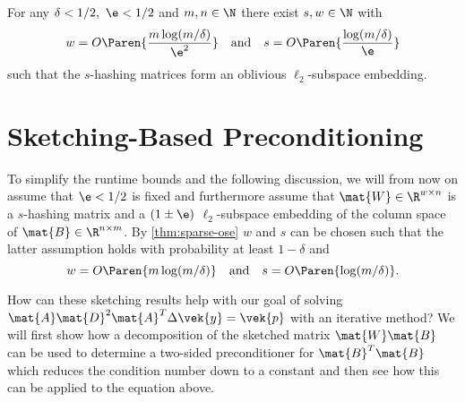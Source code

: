\begin{theorem}\label{thm:sparse-ose}
For any \(\delta < 1/2, \ \e < 1/2\) and \(m, n \in \N\) there exist \(s, w \in \N\) with
\[ w = O \Paren{\frac{m \log(m/\delta)}{\e^2}} \quad \text{and} \quad s = O \Paren{\frac{\log(m/\delta)}{\e}} \]
such that the \(s\)-hashing matrices form an oblivious \(\ell_2\)-subspace embedding.
\end{theorem}

\section{Sketching-Based Preconditioning}\label{sec:sketching-preconditioning}

To simplify the runtime bounds and the following discussion, we will from now on assume that \(\e < 1/2\) is fixed and furthermore assume that \(\mat{W} \in \R^{w \times n}\) is a \(s\)-hashing matrix and a \((1\pm\e)\) \(\ell_2\)-subspace embedding of the column space of \(\mat{B} \in \R^{n \times m}\).
By \cref{thm:sparse-ose} \(w\) and \(s\) can be chosen such that the latter assumption holds with probability at least \(1 - \delta\) and 
\begin{equation} \label{eqn:sparse-ose-params}
  w = O \Paren{m \log(m/\delta)} \quad \text{and} \quad s = O \Paren{\log(m/\delta)}.
\end{equation}

How can these sketching results help with our goal of solving \(\mat{A} \mat{D}^2 \mat{A}^T \Delta\vek{y} = \vek{p}\) with an iterative method?
We will first show how a decomposition of the sketched matrix \(\mat{W}\mat{B}\) can be used to determine a two-sided preconditioner for \(\mat{B}^T \mat{B}\) which reduces the condition number down to a constant and then see how this can be applied to the equation above.

